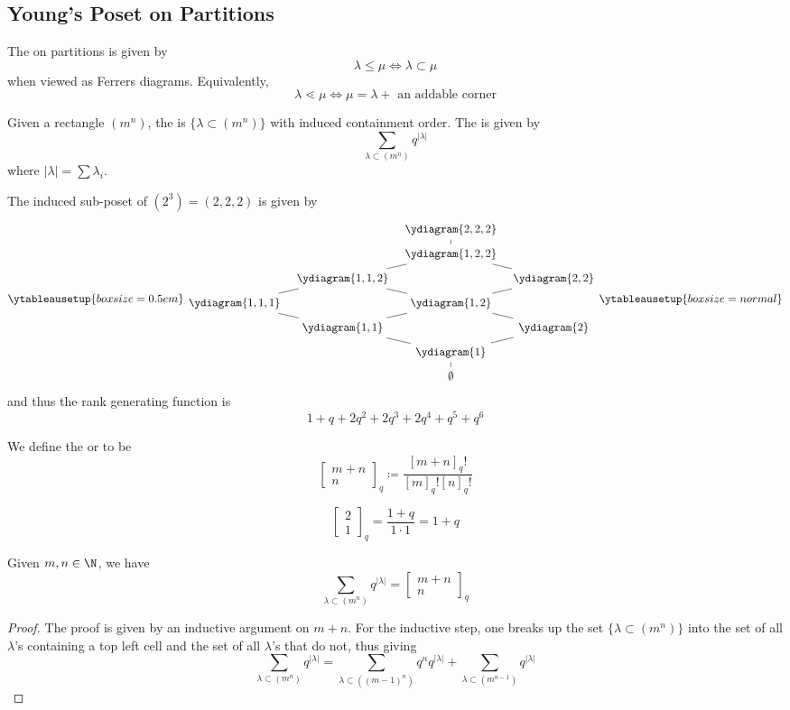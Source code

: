 \documentclass[11pt,leqno,oneside]{amsart}
\numberwithin{thm}{section}
\newcommand{\defeq}{\coloneqq}
\newcommand{\coveredby}{\mathrel{\lessdot}}
\newcommand{\quantumBinom}[3][q]{\left[ \begin{array}{c} #2 \\
                                          #3 \end{array} \right]_#1}
\newcommand{\qbinom}{\quantumBinom}
\begin{document}
\subsection{Young's Poset on Partitions}
\begin{defn}
  The  on partitions is given by \[
    \lambda \leq \mu \iff \lambda \subset \mu
  \]
  when viewed as Ferrers diagrams. Equivalently, \[
    \lambda \coveredby \mu \iff \mu = \lambda + \text{ an addable corner}
  \]
\end{defn}
\begin{defn}
  Given a rectangle \((m^n)\), the  is \(\{\lambda \subset (m^n)\}\) with induced
  containment order.   The  is given
  by \[
    \sum_{\lambda \subset (m^n)} q^{|\lambda|}
  \]
  where \(|\lambda| = \sum \lambda_i\).
\end{defn}
\begin{example}
  The induced sub-poset of \((2^3) = (2,2,2)\) is given by \[
    \ytableausetup{boxsize=0.5em}
    \begin{tikzcd}[row sep=tiny, column sep=tiny]
      &&\ydiagram{2,2,2} \ar[d,dash]& \\
      &&\ydiagram{1,2,2} \ar[ld,dash] \ar[rd,dash]&\\
      &\ydiagram{1,1,2} \ar[ld,dash] \ar[rd,dash]&&\ydiagram{2,2} \ar[ld,dash]\\
      \ydiagram{1,1,1}\ar[rd, dash]&&\ydiagram{1,2} \ar[ld,dash]
      \ar[rd,dash]&\\
      &\ydiagram{1,1}\ar[rd,dash]&&\ydiagram{2}\ar[ld,dash]\\
      &&\ydiagram{1}\ar[d,dash]&\\
      &&\emptyset&
    \end{tikzcd}
    \ytableausetup{boxsize=normal}
  \]
  and thus the rank generating function is \[
    1+q+2q^2+2q^3+2q^4+q^5+q^6
  \]
\end{example}
\begin{defn}
  We define the  or  to
  be \[
    \qbinom{m+n}{n} \defeq \frac{[m+n]_q!}{[m]_q![n]_q!}
  \]
\end{defn}
\begin{example}
  \[
    \qbinom{2}{1} = \frac{1+q}{1 \cdot 1} = 1+q
  \]
\end{example}
\begin{prop}
  Given \(m,n \in \N\), we have \[
    \sum_{\lambda \subset (m^n)} q^{|\lambda|} = \qbinom{m+n}{n}
  \]
\end{prop}
\begin{proof}
  The proof is given by an inductive argument on \(m+n\). For the
  inductive step, one breaks up the set \(\{\lambda \subset (m^n)\}\)
  into the set of all \(\lambda\)'s containing a top left cell and the
  set of all \(\lambda\)'s that do not, thus giving \[
    \sum_{\lambda \subset (m^n)} q^{|\lambda|} = \sum_{\lambda \subset
    ((m-1)^n)} q^n q^{|\lambda|} + \sum_{\lambda \subset
    (m^{n-1})} q^{|\lambda|}
  \]
\end{proof}
\end{document}
